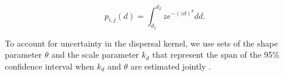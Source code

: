 \documentclass[12pt, oneside]{article}   	%
\begin{document}
\begin{equation} %
p_{i, j}(d) = \int_{d_1}^{d_2} z e^{-(zd)^\theta}  dd. \label{EQN_integratingDK}
\end{equation}

To account for uncertainty in the dispersal kernel, we use sets of the shape parameter $\theta$ and the scale parameter $k_d$ that represent the span of the 95\% confidence interval when $k_d$ and $\theta$ are estimated jointly \citep{catalanoInPrepconnectivity}.




\end{document}
